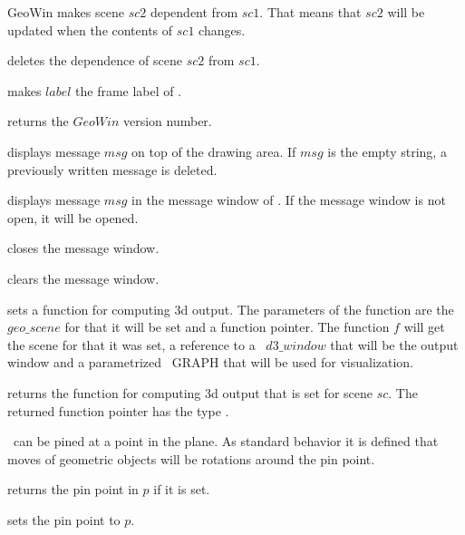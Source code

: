 \begin{ccRefClass}{GeoWin}
{makes scene $sc2$ dependent from $sc1$. That means that $sc2$
will be updated when the contents of $sc1$ changes. }

{deletes the dependence of scene $sc2$ from $sc1$. }

{makes $label$ the frame label of \ccVar. }
	
{returns the $GeoWin$ version number.}
  	   
{displays message $msg$ on top of the drawing area.
If $msg$ is the empty string, a previously written message is deleted.}

{displays message $msg$ in the message window of \ccVar.
If the message window is not open, it will be opened.}
  
{closes the message window.}
 
{clears the message window.}

\begin{ccAdvanced}

{sets a function for computing 3d output. The parameters of the function are
the $geo\_scene$ for that it will be set and a function pointer. The function $f$ will get the scene
for that it was set, a reference to a \leda\ $d3\_window$ that will be the output window and a 
parametrized \leda\ GRAPH that will be used for visualization.}

{returns the function for computing 3d output that is set for scene $sc$.
The returned function pointer has the type .}

\end{ccAdvanced}

\medskip
\ccVar\ can be pined at a point in the plane. As standard behavior it is
defined that moves of geometric objects will be rotations around the
pin point. 

{returns the pin point in $p$ if it is set.}

{sets the pin point to $p$.}


\end{ccRefClass}
